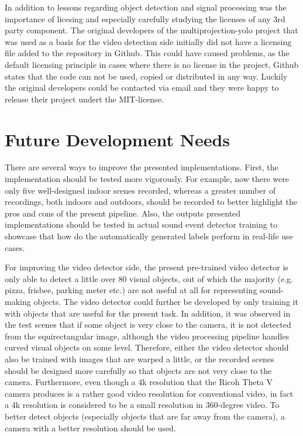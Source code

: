 In addition to lessons regarding object detection and signal processing was the importance of licesing and especially carefully studying the licenses of any 3rd party component. The original developers of the multiprojection-yolo project that was used as a basis for the video detection side initially did not have a licensing file added to the repository in Github. This could have caused problems, as the default licensing principle in cases where there is no license in the project, Github states that the code can not be used, copied or distributed in any way. Luckily the original developers could be contacted via email and they were happy to release their project undert the MIT-license. 

\section{Future Development Needs} \label{sec_future_development_needs}

There are several ways to improve the presented implementations. First, the implementation should be tested more vigorously. For example, now there were only five well-designed indoor scenes recorded, whereas a greater number of recordings, both indoors and outdoors, should be recorded to better highlight the pros and cons of the present pipeline. Also, the outputs presented implementations should be tested in actual sound event detector training to showcase that how do the automatically generated labels perform in real-life use cases.

For improving the video detector side, the present pre-trained video detector is only able to detect a little over 80 visual objects, out of which the majority (e.g. pizza, frisbee, parking meter etc.) are not useful at all for representing sound-making objects. The video detector could further be developed by only training it with objects that are useful for the present task. In addition, it was observed in the test scenes that if some object is very close to the camera, it is not detected from the equirectangular image, although the video processing pipeline handles curved visual objects on some level. Therefore, either the video detector should also be trained with images that are warped a little, or the recorded scenes should be designed more carefully so that objects are not very close to the camera. Furthermore, even though a 4k resolution that the Ricoh Theta V camera produces is a rather good video resolution for conventional video, in fact a 4k resolution is considered to be a small resolution in 360-degree video. To better detect objects (especially objects that are far away from the camera), a camera with a better resolution should be used.

